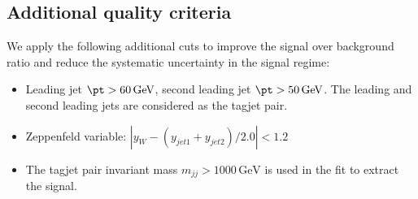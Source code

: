 
\subsection{Additional quality criteria}
\label{sec:evtSelAdditionalCuts}
We apply the following additional cuts to improve 
the signal over background ratio and reduce the systematic
uncertainty in the signal regime:
\begin{itemize}
\item 
Leading jet $\pt > 60\,\mathrm{GeV}$, second leading jet $\pt > 50\,\mathrm{GeV}$. The leading and second leading jets are considered as the tagjet pair.%
\item 
Zeppenfeld variable: $|y_{W} -(y_{jet1} + y_{jet2})/2.0| < 1.2$
\item 
The tagjet pair invariant mass $m_{jj} > 1000\,\mathrm{GeV}$ is used in the fit to extract the signal.
\end{itemize}
